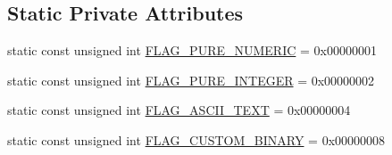 \subsection*{Static Private Attributes}
\begin{DoxyCompactItemize}
\item 
static const unsigned int \hyperlink{classCCharHistogram_af672d0091a521b09e29ac4360441008e}{F\-L\-A\-G\-\_\-\-P\-U\-R\-E\-\_\-\-N\-U\-M\-E\-R\-I\-C} = 0x00000001
\item 
static const unsigned int \hyperlink{classCCharHistogram_a68149d2c3b283c1a0dac13cb4b571826}{F\-L\-A\-G\-\_\-\-P\-U\-R\-E\-\_\-\-I\-N\-T\-E\-G\-E\-R} = 0x00000002
\item 
static const unsigned int \hyperlink{classCCharHistogram_a353dace3e2607fc835a5735a26d34b59}{F\-L\-A\-G\-\_\-\-A\-S\-C\-I\-I\-\_\-\-T\-E\-X\-T} = 0x00000004
\item 
static const unsigned int \hyperlink{classCCharHistogram_a941e9dfb7204bc5cbe48760be50e0e22}{F\-L\-A\-G\-\_\-\-C\-U\-S\-T\-O\-M\-\_\-\-B\-I\-N\-A\-R\-Y} = 0x00000008
\end{DoxyCompactItemize}


